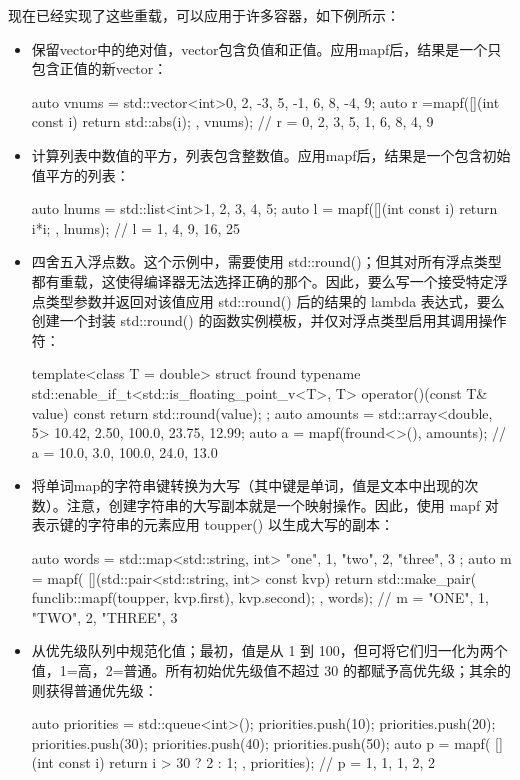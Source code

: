 现在已经实现了这些重载，可以应用于许多容器，如下例所示：

\begin{itemize}
\item
保留vector中的绝对值，vector包含负值和正值。应用mapf后，结果是一个只包含正值的新vector：

\begin{cpp}
auto vnums =
    std::vector<int>{0, 2, -3, 5, -1, 6, 8, -4, 9};
auto r =mapf([](int const i) { return std::abs(i); }, vnums);
// r = {0, 2, 3, 5, 1, 6, 8, 4, 9}
\end{cpp}

\item
计算列表中数值的平方，列表包含整数值。应用mapf后，结果是一个包含初始值平方的列表：

\begin{cpp}
auto lnums = std::list<int>{1, 2, 3, 4, 5};
auto l = mapf([](int const i) { return i*i; }, lnums);
// l = {1, 4, 9, 16, 25}
\end{cpp}

\item
四舍五入浮点数。这个示例中，需要使用 std::round()；但其对所有浮点类型都有重载，这使得编译器无法选择正确的那个。因此，要么写一个接受特定浮点类型参数并返回对该值应用 std::round() 后的结果的 lambda 表达式，要么创建一个封装 std::round() 的函数实例模板，并仅对浮点类型启用其调用操作符：

\begin{cpp}
template<class T = double>
struct fround
{
    typename std::enable_if_t<std::is_floating_point_v<T>, T>
    operator()(const T& value) const
    {
        return std::round(value);
    }
};
auto amounts =
std::array<double, 5> {10.42, 2.50, 100.0, 23.75, 12.99};
auto a = mapf(fround<>(), amounts);
// a = {10.0, 3.0, 100.0, 24.0, 13.0}
\end{cpp}

\item
将单词map的字符串键转换为大写（其中键是单词，值是文本中出现的次数）。注意，创建字符串的大写副本就是一个映射操作。因此，使用 mapf 对表示键的字符串的元素应用 toupper() 以生成大写的副本：

\begin{cpp}
auto words = std::map<std::string, int>{
    {"one", 1}, {"two", 2}, {"three", 3}
};
auto m = mapf(
[](std::pair<std::string, int> const kvp) {
    return std::make_pair(
        funclib::mapf(toupper, kvp.first),
        kvp.second);
},
words);
// m = {{"ONE", 1}, {"TWO", 2}, {"THREE", 3}}
\end{cpp}

\item
从优先级队列中规范化值；最初，值是从 1 到 100，但可将它们归一化为两个值，1=高，2=普通。所有初始优先级值不超过 30 的都赋予高优先级；其余的则获得普通优先级：

\begin{cpp}
auto priorities = std::queue<int>();
priorities.push(10);
priorities.push(20);
priorities.push(30);
priorities.push(40);
priorities.push(50);
auto p = mapf(
    [](int const i) { return i > 30 ? 2 : 1; },
    priorities);
// p = {1, 1, 1, 2, 2}
\end{cpp}
\end{itemize}

